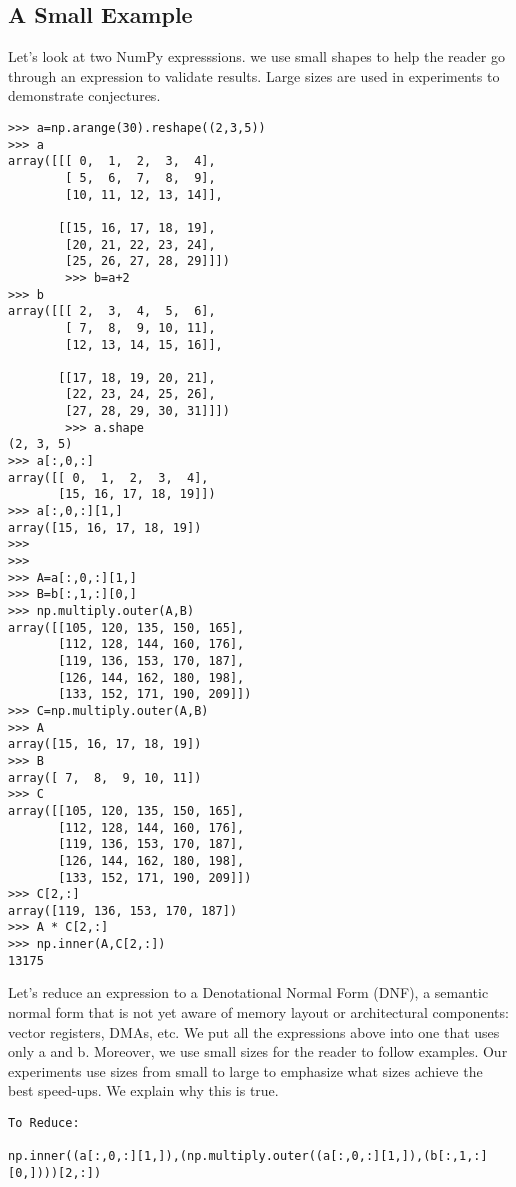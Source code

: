 \documentclass[a4paper,12pt]{article}
\begin{document}
\subsection{A Small Example}
Let's look at two NumPy expresssions. we  use small shapes to help the reader go through an expression to validate results. Large sizes are used in experiments to demonstrate conjectures. 
\begin{verbatim}   
>>> a=np.arange(30).reshape((2,3,5))
>>> a
array([[[ 0,  1,  2,  3,  4],
        [ 5,  6,  7,  8,  9],
        [10, 11, 12, 13, 14]],

       [[15, 16, 17, 18, 19],
        [20, 21, 22, 23, 24],
        [25, 26, 27, 28, 29]]])
        >>> b=a+2
>>> b
array([[[ 2,  3,  4,  5,  6],
        [ 7,  8,  9, 10, 11],
        [12, 13, 14, 15, 16]],

       [[17, 18, 19, 20, 21],
        [22, 23, 24, 25, 26],
        [27, 28, 29, 30, 31]]])
        >>> a.shape
(2, 3, 5)
>>> a[:,0,:]
array([[ 0,  1,  2,  3,  4],
       [15, 16, 17, 18, 19]])
>>> a[:,0,:][1,]
array([15, 16, 17, 18, 19])
>>> 
>>> 
>>> A=a[:,0,:][1,]
>>> B=b[:,1,:][0,]
>>> np.multiply.outer(A,B)
array([[105, 120, 135, 150, 165],
       [112, 128, 144, 160, 176],
       [119, 136, 153, 170, 187],
       [126, 144, 162, 180, 198],
       [133, 152, 171, 190, 209]])
>>> C=np.multiply.outer(A,B)
>>> A
array([15, 16, 17, 18, 19])
>>> B
array([ 7,  8,  9, 10, 11])
>>> C
array([[105, 120, 135, 150, 165],
       [112, 128, 144, 160, 176],
       [119, 136, 153, 170, 187],
       [126, 144, 162, 180, 198],
       [133, 152, 171, 190, 209]])
>>> C[2,:]
array([119, 136, 153, 170, 187])
>>> A * C[2,:]
>>> np.inner(A,C[2,:])
13175
\end{verbatim}
     
Let's reduce an expression to
a Denotational Normal Form (DNF), a semantic normal form that is not yet aware of memory layout or architectural components: vector registers, DMAs, etc.
We put all the expressions above into one that uses only a and b.
Moreover, we use small sizes for the reader to follow examples. Our experiments
use sizes from small to large to emphasize what sizes achieve the best speed-ups. We
explain why this is true.
\begin{verbatim}
To Reduce:

np.inner((a[:,0,:][1,]),(np.multiply.outer((a[:,0,:][1,]),(b[:,1,:][0,])))[2,:])

\end{verbatim}
  
\end{document}
